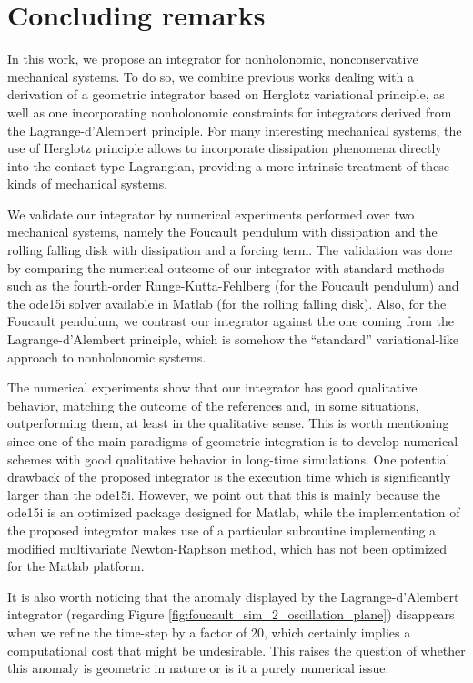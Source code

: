 \documentclass{aims}
\numberwithin{equation}{section}
\theoremstyle{definition}
\begin{document}
\section{Concluding remarks}\label{sec:Conclusions}

In this work, we propose an integrator for nonholonomic, nonconservative mechanical systems. To do so, we combine previous works dealing with a derivation of a geometric integrator based on Herglotz variational principle, as well as one incorporating nonholonomic constraints for integrators derived from the Lagrange-d'Alembert principle.  {For many interesting mechanical systems, the use of Herglotz principle allows to incorporate dissipation phenomena directly into the contact-type Lagrangian, providing a more intrinsic treatment of these kinds of mechanical systems.}

We validate our integrator by numerical experiments performed over two mechanical systems, namely the Foucault pendulum with dissipation and the rolling falling disk with dissipation and a forcing term. The validation was done by comparing the numerical outcome of our integrator with standard methods such as the fourth-order Runge-Kutta-Fehlberg (for the Foucault pendulum) and the ode15i solver available in Matlab (for the rolling falling disk). Also, for the Foucault pendulum, we contrast our integrator against the one coming from the Lagrange-d'Alembert principle, which is somehow the ``standard'' variational-like approach to nonholonomic systems.

The numerical experiments show that our integrator has good qualitative behavior, matching the outcome of the references and, in some situations, outperforming them, at least in the qualitative sense. This is worth mentioning since one of the main paradigms of geometric integration is to develop numerical schemes with good qualitative behavior in long-time simulations. One potential drawback of the proposed integrator is the execution time which is significantly larger than the ode15i. However, we point out that this is mainly because the ode15i is an optimized package designed for Matlab, while the implementation of the proposed integrator makes use of a particular subroutine implementing a modified multivariate Newton-Raphson method, which has not been optimized for the Matlab platform.

It is also worth noticing that the anomaly displayed by the Lagrange-d'Alembert integrator (regarding Figure \ref{fig:foucault_sim_2_oscillation_plane}) disappears when we refine the time-step by a factor of 20, which certainly implies a computational cost that might be undesirable. This raises the question of whether this anomaly is geometric in nature or is it a purely numerical issue.
\end{document}
